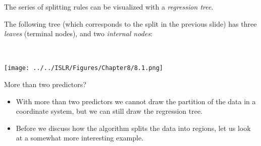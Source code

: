 \documentclass[10pt,ignorenonframetext,]{beamer}
\begin{document}
\begin{frame}

The series of splitting rules can be visualized with a \emph{regression
tree}.

The following tree (which corresponds to the split in the previous
slide) has three \emph{leaves} (terminal nodes), and two \emph{internal
nodes}:

\(~\)

\centering

\texttt{[image: ../../ISLR/Figures/Chapter8/8.1.png]}

\end{frame}

\begin{frame}

\begin{block}{More than two predictors?}

\vspace{2mm}

\begin{itemize}
\item
  With more than two predictors we cannot draw the partition of the data
  in a coordinate system, but we can still draw the regression tree.
\item
  Before we discuss how the algorithm splits the data into regions, let
  us look at a somewhat more interesting example.
\end{itemize}

\end{block}

\end{frame}
\end{document}
